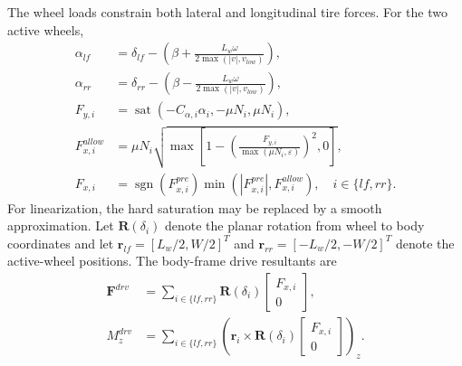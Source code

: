 \documentclass{ieeeaccess}
\begin{document}
The wheel loads constrain both lateral and longitudinal tire forces. For the two active wheels,
\begin{equation}
\begin{aligned}
\alpha_{lf}&=\delta_{lf}-\left(\beta+\frac{L_w\omega}{2\max(|v|,v_{low})}\right),\\
\alpha_{rr}&=\delta_{rr}-\left(\beta-\frac{L_w\omega}{2\max(|v|,v_{low})}\right),\\
F_{y,i}&=\operatorname{sat}\!\left(-C_{\alpha,i}\alpha_i,-\mu N_i,\mu N_i\right),\\
F_{x,i}^{allow}&=\mu N_i\sqrt{\max\!\left[1-\left(\frac{F_{y,i}}{\max(\mu N_i,\varepsilon)}\right)^2,0\right]},\\
F_{x,i}&=\operatorname{sgn}(F_{x,i}^{pre})\min\!\left(|F_{x,i}^{pre}|,F_{x,i}^{allow}\right),
\quad i\in\{lf,rr\}.
\end{aligned}
\label{eq:agv_tire_forces}
\end{equation}
For linearization, the hard saturation may be replaced by a smooth approximation. Let $\bm{R}(\delta_i)$ denote the planar rotation from wheel to body coordinates and let $\bm{r}_{lf}=[L_w/2,W/2]^T$ and $\bm{r}_{rr}=[-L_w/2,-W/2]^T$ denote the active-wheel positions. The body-frame drive resultants are
\begin{equation}
\begin{aligned}
\bm{F}^{drv}&=\sum_{i\in\{lf,rr\}}\bm{R}(\delta_i)
\begin{bmatrix}F_{x,i}\\0\end{bmatrix},\\
M_z^{drv}&=\sum_{i\in\{lf,rr\}}
\left(\bm{r}_i\times\bm{R}(\delta_i)
\begin{bmatrix}F_{x,i}\\0\end{bmatrix}\right)_z.
\end{aligned}
\label{eq:agv_drive_resultants}
\end{equation}
\end{document}
